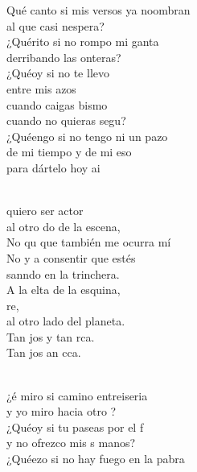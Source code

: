 \documentclass[12pt]{article}
\begin{document}
\begin{multicols*}{2}
\begin{cancion}%
	Qué canto si mis versos ya noombran\\
	al que casi nespera?\\
	¿Quérito si no rompo mi ganta \\
	derribando las onteras?\\
	¿Quéoy si no te llevo  \\
	entre mis azos\\
	cuando caigas bismo\\
	cuando no quieras segu?\\
	¿Quéengo si no tengo ni un pazo \\
	de mi tiempo y de mi eso\\
	para dártelo hoy ai\\\jump\\
	\begin{chorus}%
	 quiero ser actor\\
	al otro do de la escena,\\
	No qu que también me ocurra mí\\
	No y a consentir que estés \\
	sanndo en la trinchera.\\
	A la elta de la esquina,\\
        re,\\
al otro lado del planeta.\\
	Tan jos y tan rca.\\
	Tan jos an cca.\\
	\end{chorus}%
	\jump\\
	¿é miro si camino entreiseria \\
	y yo miro hacia otro ?\\
	¿Quéoy si tu paseas por el f \\
	y no ofrezco mis s manos?\\
	¿Quéezo si no hay fuego en la pabra \\

\end{cancion}
\end{multicols*}
\end{document}
